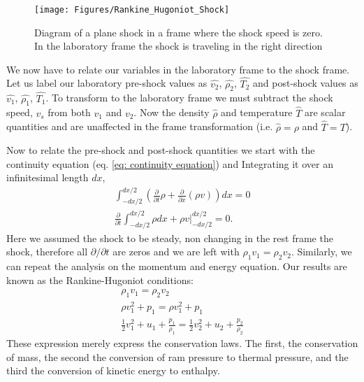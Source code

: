 \documentclass{article}
\begin{document}
\begin{figure}[h!]
\begin{center}
\texttt{[image: Figures/Rankine\_Hugoniot\_Shock]}
\end{center}
\caption{Diagram of a plane shock in a frame where the shock speed is zero. In the laboratory frame the shock is traveling in the right direction}
\label{fig: Shock}
\end{figure}

We now have to relate our variables in the laboratory frame to the shock frame. Let us label our laboratory pre-shock values as $\hat{v_2}$, $\hat{\rho_2}$, $\hat{T_2}$ and post-shock values as $\hat{v_1}$, $\hat{\rho_1}$, $\hat{T_1}$. To transform to the laboratory frame we must subtract the shock speed, $v_s$ from both $v_1$ and $v_2$. Now the density $\hat{\rho}$ and temperature $\hat{T}$ are scalar quantities and are unaffected in the frame transformation (i.e. $\hat{\rho} = \rho$ and $\hat{T} = T$). 

Now to relate the pre-shock and post-shock quantities we start with the continuity equation (eq. \ref{eq: continuity equation}) and Integrating it over an infinitesimal length $dx$,
\begin{gather}
\int_{-dx/2}^{dx/2} \left(\frac{\partial}{\partial t}\rho + \frac{\partial}{\partial x}\left(\rho v\right)\right)dx = 0\\
\frac{\partial}{\partial t} \int_{-dx/2}^{dx/2} \rho dx + \rho v\bigg|_{-dx/2}^{dx/2}=0.
\end{gather} 
Here we assumed the shock to be steady, non changing in the rest frame the shock, therefore all $\partial/\partial t$ are zeros and we are left with $\rho_1 v_1 = \rho_2 v_2$. Similarly, we can repeat the analysis on the momentum and energy equation. Our results are known as the Rankine-Hugoniot conditions:
\begin{gather}
\label{eq: density condition}
\rho_1 v_1 = \rho_2 v_2\\
\label{eq: momentum condition}
\rho v_1^2 +p_1 = \rho v_1^2 +p_1\\
\label{eq: energy condition}
\frac{1}{2} v_1^2 + u_1 + \frac{p_1}{\rho_1} = \frac{1}{2} v_2^2 + u_2 + \frac{p_2}{\rho_2}
\end{gather}
These expression merely express the conservation laws. The first, the conservation of mass, the second the conversion of ram pressure to thermal pressure, and the third the conversion of kinetic energy to enthalpy.
\end{document}
